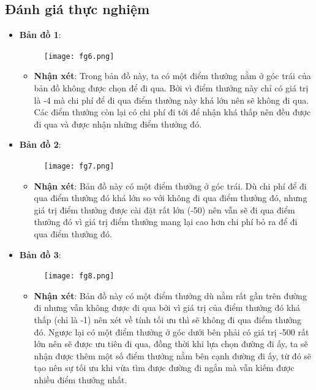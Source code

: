 \documentclass[11pt]{article} %
\begin{document}
\subsection{Đánh giá thực nghiệm}
\begin{itemize}
	\item \textbf{Bản đồ 1}:
	\begin{figure}[h] %
		\centering
		\texttt{[image: fg6.png]} %
	\end{figure}
	\begin{itemize}
		\item \textbf{Nhận xét}: Trong bản đồ này, ta có một điểm thưởng nằm ở góc trái của bản đồ không được chọn để đi qua. Bởi vì điểm thưởng này chỉ có giá trị là -4 mà chi phí để đi qua điểm thưởng này khá lớn nên sẽ không đi qua. Các điểm thưởng còn lại có chi phí đi tới để nhận khá thấp nên đều được đi qua và được nhận những điểm thưởng đó.
	\end{itemize}

	\newpage
	\item \textbf{Bản đồ 2}:
	\begin{figure}[h]
		\centering
		\texttt{[image: fg7.png]} %
	\end{figure}
	\begin{itemize}
		\item \textbf{Nhận xét}: Bản đồ này có một điểm thưởng ở góc trái. Dù chi phí để đi qua điểm thưởng đó khá lớn so với không đi qua điểm thưởng đó, nhưng giá trị điểm thưởng được cài đặt rất lớn (-50) nên vẫn sẽ đi qua điểm thưởng đó vì giá trị điểm thưởng mang lại cao hơn chi phí bỏ ra để đi qua điểm thưởng đó. 
	\end{itemize}

	\newpage
	\item \textbf{Bản đồ 3}:
	\begin{figure}[h]
		\centering
		\texttt{[image: fg8.png]} %
	\end{figure}
	\begin{itemize}
		\item \textbf{Nhận xét}: Bản đồ này có một điểm thưởng dù nằm rất gần trên đường đi nhưng vẫn không được đi qua bởi vì giá trị của điểm thưởng đó khá thấp (chỉ là -1) nên xét về tính tối ưu thì sẽ không đi qua điểm thưởng đó. Ngược lại có một điểm thưởng ở góc dưới bên phải có giá trị -500 rất lớn nên sẽ được ưu tiên đi qua, đồng thời khi lựa chọn đường đi ấy, ta sẽ nhận được thêm một số điểm thưởng nằm bên cạnh đường đi ấy, từ đó sẽ tạo nên sự tối ưu khi vừa tìm được đường đi ngắn mà vẫn kiếm được nhiều điểm thưởng nhất.
	\end{itemize}
\end{itemize}



\end{document}
